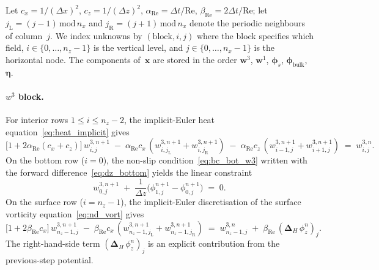 \documentclass{article}
\newcommand{\Rey}{\mathrm{Re}}
\newcommand{\xx}{\mathbf{x}}
\begin{document}
Let $c_x = 1/(\Delta x)^2$, $c_z = 1/(\Delta z)^2$, $\alpha_{\Rey} = \Delta t/\Rey$, $\beta_{\Rey} = 2\Delta t/\Rey$; let $j_{\mathrm{L}} = (j - 1)\,\mathrm{mod}\, n_x$ and $j_{\mathrm{R}} = (j + 1)\,\mathrm{mod}\, n_x$ denote the periodic neighbours of column~$j$.
We index unknowns by $(\mathrm{block}, i, j)$ where the block specifies which field, $i \in \{0,\dots,n_z-1\}$ is the vertical level, and $j \in \{0,\dots,n_x-1\}$ is the horizontal node.
The components of~$\xx$ are stored in the order $\bm{w}^3$, $\bm{w}^1$, $\bm{\phi}_s$, $\bm{\phi}_{\mathrm{bulk}}$, $\bm{\eta}$.

\paragraph{$w^3$ block.}
For interior rows $1 \le i \le n_z - 2$, the implicit-Euler heat equation~\eqref{eq:heat_implicit} gives
\begin{equation}
    \big[1 + 2\alpha_{\Rey}(c_x + c_z)\big]\,w^{3,n+1}_{i,j} \;-\; \alpha_{\Rey} c_x\,(w^{3,n+1}_{i, j_{\mathrm{L}}} + w^{3,n+1}_{i, j_{\mathrm{R}}}) \;-\; \alpha_{\Rey} c_z\,(w^{3,n+1}_{i-1, j} + w^{3,n+1}_{i+1, j}) \;=\; w^{3,n}_{i,j}. \label{eq:w3_interior_row}
\end{equation}
On the bottom row ($i = 0$), the non-slip condition~\eqref{eq:bc_bot_w3} written with the forward difference~\eqref{eq:dz_bottom} yields the linear constraint
\begin{equation}
    w^{3,n+1}_{0, j} \;+\; \frac{1}{\Delta z}\big(\phi^{n+1}_{1, j} - \phi^{n+1}_{0, j}\big) \;=\; 0. \label{eq:w3_bottom_row}
\end{equation}
On the surface row ($i = n_z - 1$), the implicit-Euler discretisation of the surface vorticity equation~\eqref{eq:nd_vort} gives
\begin{equation}
    \big[1 + 2\beta_{\Rey} c_x\big]\,w^{3,n+1}_{n_z-1, j} \;-\; \beta_{\Rey} c_x\,(w^{3,n+1}_{n_z-1, j_{\mathrm{L}}} + w^{3,n+1}_{n_z-1, j_{\mathrm{R}}}) \;=\; w^{3,n}_{n_z-1, j} \;+\; \beta_{\Rey}\,(\bm{\Delta}_H\,\phi_z^n)_j. \label{eq:w3_surface_row}
\end{equation}
The right-hand-side term $(\bm{\Delta}_H\,\phi_z^n)_j$ is an explicit contribution from the previous-step potential.
\end{document}
